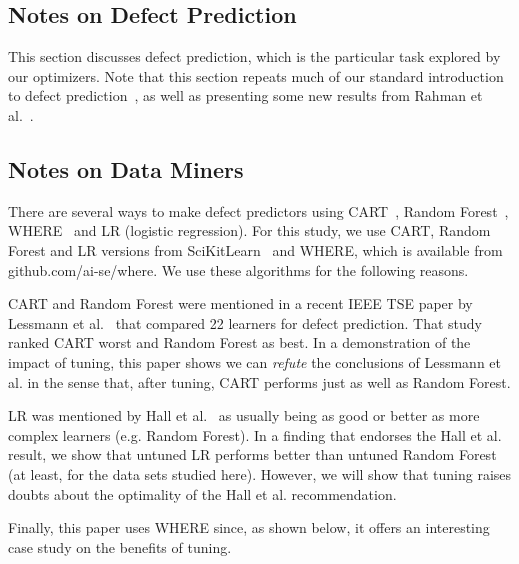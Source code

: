 \documentclass[final,twocolumn,5p]{elsarticle}
\begin{document}
\subsection{Notes on Defect Prediction}


This section discusses defect prediction,
which is the particular
task explored by our optimizers.
Note that this section repeats much of 
our standard introduction to defect prediction~\cite{me15:book1},
as well as presenting    some new results from Rahman et al.~\cite{rahman14:icse}. 
 





 

 \subsection{Notes on Data Miners}
 
There are several ways to make defect predictors
using  CART~\cite{brieman00}, Random Forest~\cite{breiman84}, 
 WHERE~\cite{menzies2013local} and LR (logistic regression).
For this study, we use CART, Random Forest and LR versions  from 
SciKitLearn~\cite{scikit-learn} and
WHERE, which is available from
github.com/ai-se/where. 
 We use  these algorithms for the following reasons.
 
CART and Random Forest were mentioned in
a recent IEEE TSE paper by Lessmann et al.~\cite{lessmann2008benchmarking} that compared 22  
learners for  defect prediction.
That study ranked  CART  worst  and Random Forest as best.
In a demonstration of the impact of tuning,
this paper shows  we can {\em refute} the conclusions of  Lessmann et al.
in the sense that, after tuning,
CART
performs just as well as
 Random Forest.

LR was  mentioned by Hall et al.~\cite{hall11}
as usually being as good or better as more complex learners (e.g.
Random Forest). In a finding that endorses the Hall et al. result,
we show that untuned LR performs better than 
untuned Random Forest (at least, for the data sets studied here). However,
we will show that tuning raises doubts about the optimality of the
Hall et al. recommendation.

Finally,  this
 paper uses WHERE since, as shown below,
it offers an interesting case study on the benefits of tuning.
\end{document}
